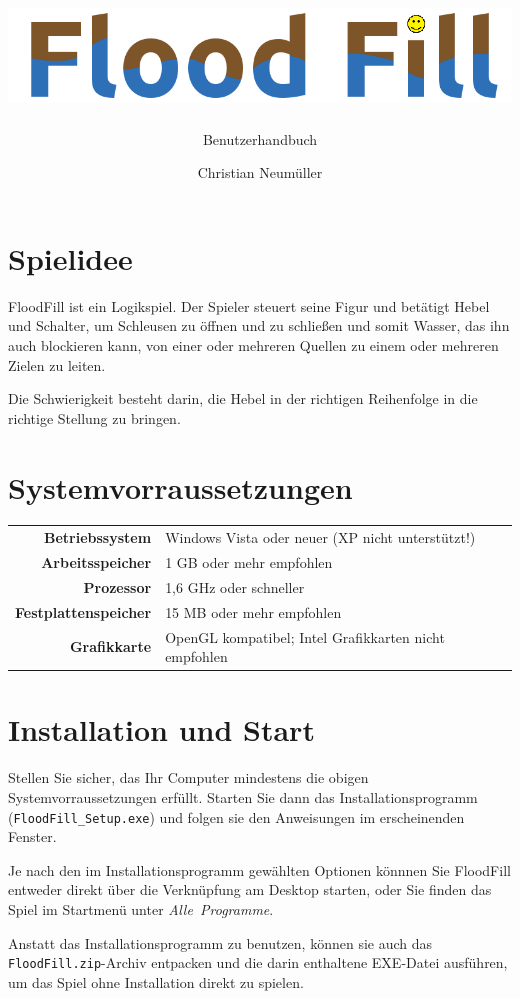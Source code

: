 \documentclass[oneside,12pt]{scrartcl}
\title{\includegraphics[width=\textwidth]{px/FloodFillLogo.png}}
\subtitle{Benutzerhandbuch}
\author{Christian Neumüller}
\newcommand{\ui}[1]{\mbox{\textit{#1}}}
\begin{document}
\maketitle
\tableofcontents

\section{Spielidee}
\enlargethispage{\baselineskip}
FloodFill ist ein Logikspiel. Der Spieler steuert seine Figur und betätigt Hebel und Schalter, um Schleusen zu öffnen und zu schließen und somit Wasser, das ihn auch blockieren kann, von einer oder mehreren Quellen zu einem oder mehreren Zielen zu leiten.

Die Schwierigkeit besteht darin, die Hebel in der richtigen Reihenfolge in die richtige Stellung zu bringen.

\section{Systemvorraussetzungen}
\begin{tabular}{>{\bfseries}rl}
Betriebssystem	& Windows Vista oder neuer (XP nicht unterstützt!)\\
Arbeitsspeicher	& 1 GB oder mehr empfohlen \\
Prozessor		& 1,6 GHz oder schneller \\
Festplattenspeicher & 15 MB oder mehr empfohlen \\
Grafikkarte		& OpenGL kompatibel; Intel Grafikkarten nicht empfohlen \\
\end{tabular}

\section{Installation und Start}
Stellen Sie sicher, das Ihr Computer mindestens die obigen Systemvorraussetzungen erfüllt. Starten Sie dann das Installationsprogramm (\texttt{FloodFill\_Setup.exe}) und folgen sie den Anweisungen im erscheinenden Fenster.

Je nach den im Installationsprogramm gewählten Optionen könnnen Sie FloodFill entweder direkt über die Verknüpfung am Desktop starten, oder Sie finden das Spiel im Startmenü unter \ui{Alle Programme}.

Anstatt das Installationsprogramm zu benutzen, können sie auch das \texttt{FloodFill.zip}-Archiv entpacken und die darin enthaltene EXE-Datei ausführen, um das Spiel ohne Installation direkt zu spielen.
\end{document}
